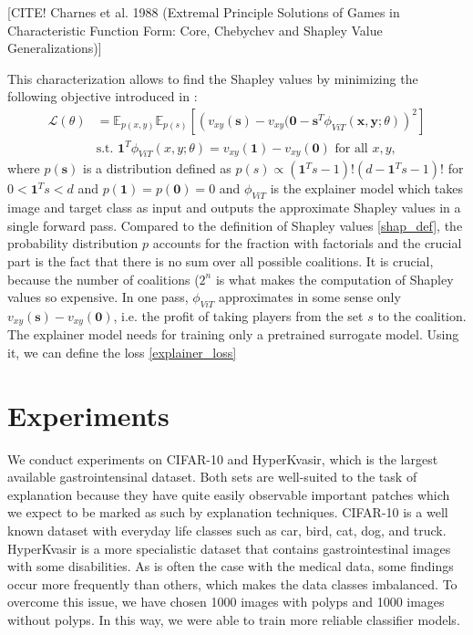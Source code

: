 \documentclass[magisterska,en]{pracamgr}
\begin{document}
[CITE! Charnes et al. 1988 (Extremal Principle Solutions of Games in Characteristic Function Form: Core, Chebychev and Shapley Value Generalizations)]

This characterization allows to find the Shapley values by minimizing the following objective introduced in \cite{DBLP:conf/iclr/JethaniSCLR22}:
\begin{equation}
    \begin{split}
        \mathcal{L}(\theta) &= \mathbb{E}_{p(x,y)} \mathbb{E}_{p(s)}  \left[\left(v_{xy}(\mathbf{s})-v_{xy}(\mathbf{0} -\mathbf{s}^T \phi _{ViT}(\mathbf{x},\mathbf{y};\theta)\right)^2\right] 
        \\
        &    \textrm{s.t.  } \mathbf{1}^T \phi _{ViT}(x,y;\theta) = v_{xy}(\mathbf{1}) - v_{xy}(\mathbf{0}) \textrm{    for all   } x,y,
    \end{split}
\end{equation}\label{explainer_loss}
where $p(\mathbf{s})$ is a distribution defined as $p(s) \propto (\mathbf{1}^Ts - 1)! (d - \mathbf{1}^Ts -1)!$ for $0 < \mathbf{1}^Ts < d$ and $p(\mathbf{1}) = p(\mathbf{0}) = 0$ and $\phi _{ViT}$ is the explainer model which takes image and target class as input and outputs the approximate Shapley values in a single forward pass. Compared to the definition of Shapley values \ref{shap_def}, the probability distribution $p$ accounts for the fraction with factorials and the crucial part is the fact that there is no sum over all possible coalitions. It is crucial, because the number of coalitions ($2^n$ is what makes the computation of Shapley values so expensive. In one pass, $\phi _{ViT}$ approximates in some sense only $v_{xy}(\mathbf{s})-v_{xy}(\mathbf{0})$, i.e. the profit of taking players from the set $s$ to the coalition. The explainer model needs for training only a pretrained surrogate model. Using it, we can define the loss \ref{explainer_loss}




\chapter{Experiments}\label{r:experiments}
We conduct experiments on CIFAR-10 and HyperKvasir, which is the largest available gastrointensinal dataset. Both sets are well-suited to the task of explanation because they have quite easily observable important patches which we expect to be marked as such by explanation techniques. CIFAR-10 is a well known dataset with everyday life classes such as car, bird, cat, dog, and truck. HyperKvasir is a more specialistic dataset that contains gastrointestinal images with some disabilities. As is often the case with the medical data, some findings occur more frequently than others, which makes the data classes imbalanced. To overcome this issue, we have chosen 1000 images with polyps and 1000 images without polyps. In this way, we were able to train more reliable classifier models. 
\end{document}
